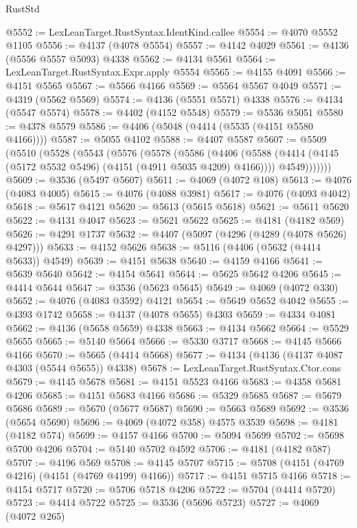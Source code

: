 \begin{lexlean}{RustStd}
\begin{coremodule}
{\begin{coremodule}
{{{{{{{{{{{{{{{{{{{{{{{{{{{{{{{{{{{{{{{{{{{{{{{{{{@5552 := LexLeanTarget.RustSyntax.IdentKind.callee
@5554 := @4070 @5552 @1105
@5556 := @4137 (@4078 @5554)
@5557 := @4142 @4029
@5561 := @4136 (@5556 @5557 @5093) @4338
@5562 := @4134 @5561
@5564 := LexLeanTarget.RustSyntax.Expr.apply @5554
@5565 := @4155 @4091
@5566 := @4151 @5565
@5567 := @5566 @4166
@5569 := @5564 @5567 @4049
@5571 := @4319 (@5562 @5569)
@5574 := @4136 (@5551 @5571) @4338
@5576 := @4134 (@5547 @5574)
@5578 := @4402 (@4152 @5548)
@5579 := @5536 @5051
@5580 := @4378 @5579
@5586 := @4406 (@5048 (@4414 (@5535 (@4151 @5580 @4166))))
@5587 := @5055 @4102
@5588 := @4407 @5587
@5607 := @5509
    (@5510
      (@5528
        (@5543
          (@5576
            (@5578
              (@5586
                (@4406
                  (@5588 (@4414 (@4145 (@5172 @5532 @5496) (@4151 (@4911 @5035 @4209) @4166))))
                  @4549)))))))
@5609 := @3536 (@5497 @5607)
@5611 := @4069 (@4072 @108)
@5613 := @4076 (@4083 @4005)
@5615 := @4076 (@4088 @3981)
@5617 := @4076 (@4093 @4042)
@5618 := @5617 @4121
@5620 := @5613 (@5615 @5618)
@5621 := @5611 @5620
@5622 := @4131 @4047
@5623 := @5621 @5622
@5625 := @4181 (@4182 @569)
@5626 := @4291 @1737
@5632 := @4407 (@5097 (@4296 (@4289 (@4078 @5626) @4297)))
@5633 := @4152 @5626
@5638 := @5116 (@4406 (@5632 (@4414 @5633)) @4549)
@5639 := @4151 @5638
@5640 := @4159 @4166
@5641 := @5639 @5640
@5642 := @4154 @5641
@5644 := @5625 @5642 @4206
@5645 := @4414 @5644
@5647 := @3536 (@5623 @5645)
@5649 := @4069 (@4072 @330)
@5652 := @4076 (@4083 @3592) @4121
@5654 := @5649 @5652 @4042
@5655 := @4393 @1742
@5658 := @4137 (@4078 @5655) @4303
@5659 := @4334 @4081
@5662 := @4136 (@5658 @5659) @4338
@5663 := @4134 @5662
@5664 := @5529 @5655
@5665 := @5140 @5664
@5666 := @5330 @3717
@5668 := @4145 @5666 @4166
@5670 := @5665 (@4414 @5668)
@5677 := @4134 (@4136 (@4137 @4087 @4303 (@5544 @5655)) @4338)
@5678 := LexLeanTarget.RustSyntax.Ctor.cons
@5679 := @4145 @5678
@5681 := @4151 @5523 @4166
@5683 := @4358 @5681 @4206
@5685 := @4151 @5683 @4166
@5686 := @5329 @5685
@5687 := @5679 @5686
@5689 := @5670 (@5677 @5687)
@5690 := @5663 @5689
@5692 := @3536 (@5654 @5690)
@5696 := @4069 (@4072 @358) @4575 @3539
@5698 := @4181 (@4182 @574)
@5699 := @4157 @4166
@5700 := @5094 @5699
@5702 := @5698 @5700 @4206
@5704 := @5140 @5702 @4592
@5706 := @4181 (@4182 @587)
@5707 := @4196 @569
@5708 := @4145 @5707
@5715 := @5708 (@4151 (@4769 @4216) (@4151 (@4769 @4199) @4166))
@5717 := @4151 @5715 @4166
@5718 := @4154 @5717
@5720 := @5706 @5718 @4206
@5722 := @5704 (@4414 @5720)
@5723 := @4414 @5722
@5725 := @3536 (@5696 @5723)
@5727 := @4069 (@4072 @265)
}}}}}}}}}}}}}}}}}}}}}}}}}}}}}}}}}}}}}}}}}}}}}}}}}}
\end{coremodule}}
\end{coremodule}
\end{lexlean}
